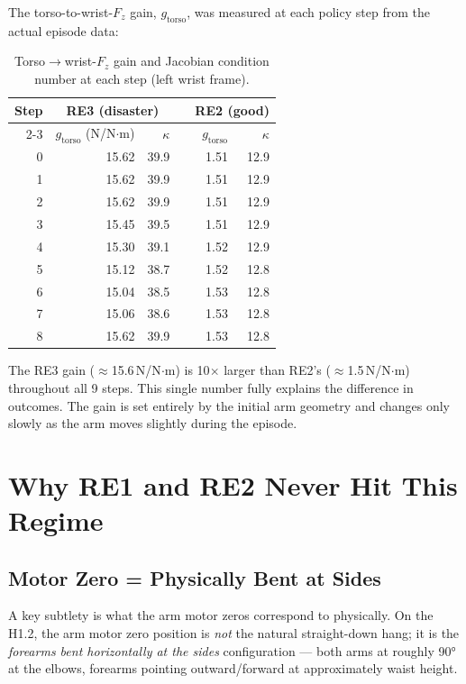 \documentclass[11pt,a4paper]{article}
\newcommand{\re}[1]{\textcolor{red3}{\textbf{#1}}}
\newcommand{\good}[1]{\textcolor{blue2}{\textbf{#1}}}
\begin{document}
The torso-to-wrist-$F_z$ gain, $g_\text{torso}$, was measured at each
policy step from the actual episode data:

\begin{table}[H]
\centering
\caption{Torso$\to$wrist-$F_z$ gain and Jacobian condition number at each
         step (left wrist frame).}
\label{tab:gains}
\begin{tabular}{rrrrrr}
\toprule
Step &
\multicolumn{2}{c}{\re{RE3 (disaster)}} &&
\multicolumn{2}{c}{\good{RE2 (good)}} \\
\cmidrule{2-3}\cmidrule{5-6}
 & $g_\text{torso}$ (N/N$\cdot$m) & $\kappa$ && $g_\text{torso}$ & $\kappa$ \\
\midrule
0 & 15.62 & 39.9 && 1.51 & 12.9 \\
1 & 15.62 & 39.9 && 1.51 & 12.9 \\
2 & 15.62 & 39.9 && 1.51 & 12.9 \\
3 & 15.45 & 39.5 && 1.51 & 12.9 \\
4 & 15.30 & 39.1 && 1.52 & 12.9 \\
5 & 15.12 & 38.7 && 1.52 & 12.8 \\
6 & 15.04 & 38.5 && 1.53 & 12.8 \\
7 & 15.06 & 38.6 && 1.53 & 12.8 \\
8 & 15.62 & 39.9 && 1.53 & 12.8 \\
\bottomrule
\end{tabular}
\end{table}

\noindent The RE3 gain ($\approx$15.6\,N/N$\cdot$m) is 10$\times$ larger
than RE2's ($\approx$1.5\,N/N$\cdot$m) throughout all 9 steps.  This
single number fully explains the difference in outcomes.  The gain is set
entirely by the initial arm geometry and changes only slowly as the arm
moves slightly during the episode.

\section{Why RE1 and RE2 Never Hit This Regime}
\label{sec:re1re2_arms}

\subsection{Motor Zero = Physically Bent at Sides}

A key subtlety is what the arm motor zeros correspond to physically.  On
the H1.2, the arm motor zero position is \emph{not} the natural straight-down
hang; it is the \emph{forearms bent horizontally at the sides} configuration
--- both arms at roughly 90° at the elbows, forearms pointing outward/forward
at approximately waist height.
\end{document}
